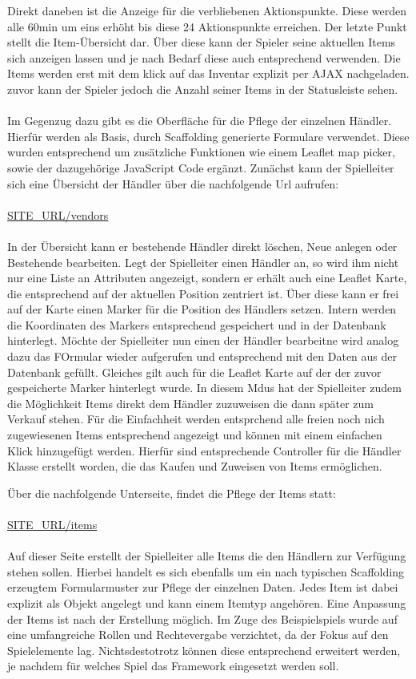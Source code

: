 Direkt daneben ist die Anzeige für die verbliebenen Aktionspunkte. Diese werden alle 60min um eins erhöht bis diese 24 Aktionspunkte erreichen. Der letzte Punkt stellt die Item-Übersicht dar. Über diese kann der Spieler seine aktuellen Items sich anzeigen lassen und je nach Bedarf diese auch entsprechend verwenden. Die Items werden erst mit dem klick auf das Inventar explizit per AJAX nachgeladen. zuvor kann der Spieler jedoch die Anzahl seiner Items in der Statusleiste sehen.
\\\\
Im Gegenzug dazu gibt es die Oberfläche für die Pflege der einzelnen Händler. Hierfür werden als Basis, durch Scaffolding generierte Formulare verwendet. Diese wurden entsprechend um zusätzliche Funktionen wie einem Leaflet map picker, sowie der dazugehörige JavaScript Code ergänzt. Zunächst kann der Spielleiter sich eine Übersicht der Händler über die nachfolgende Url aufrufen:
\\\\
\url{SITE\_URL/vendors}
\\\\
In der Übersicht kann er bestehende Händler direkt löschen, Neue anlegen oder Bestehende bearbeiten. 
Legt der Spielleiter einen Händler an, so wird ihm nicht nur eine Liste an Attributen angezeigt, sondern er erhält auch eine Leaflet Karte, die entsprechend auf der aktuellen Position zentriert ist. Über diese kann er frei auf der Karte einen Marker für die Position des Händlers setzen. Intern werden die Koordinaten des Markers entsprechend gespeichert und in der Datenbank hinterlegt. Möchte der Spielleiter nun einen der Händler bearbeitne wird analog dazu das FOrmular wieder aufgerufen und entsprechend mit den Daten aus der Datenbank gefüllt. Gleiches gilt auch für die Leaflet Karte auf der der zuvor gespeicherte Marker hinterlegt wurde. In diesem Mdus hat der Spielleiter zudem die Möglichkeit Items direkt dem Händler zuzuweisen die dann später zum Verkauf stehen. Für die Einfachheit werden entsprchend alle freien noch nich zugewiesenen Items entsprechend angezeigt und können mit einem einfachen Klick hinzugefügt werden. Hierfür sind entsprechende Controller für die Händler Klasse erstellt worden, die das Kaufen und Zuweisen von Items ermöglichen.

Über die nachfolgende Unterseite, findet die Pflege der Items statt:
\\\\
\url{SITE\_URL/items}
\\\\
Auf dieser Seite erstellt der Spielleiter alle Items die den Händlern zur Verfügung stehen sollen. Hierbei handelt es sich ebenfalls um ein nach typischen Scaffolding erzeugtem Formularmuster zur Pflege der einzelnen Daten. Jedes Item ist dabei explizit als Objekt angelegt und kann einem Itemtyp angehören. Eine Anpassung der Items ist nach der Erstellung möglich. Im Zuge des Beispielspiels wurde auf eine umfangreiche Rollen und Rechtevergabe verzichtet, da der Fokus auf den Spielelemente lag. Nichtsdestotrotz können diese entsprechend erweitert werden, je nachdem für welches Spiel das Framework eingesetzt werden soll.

